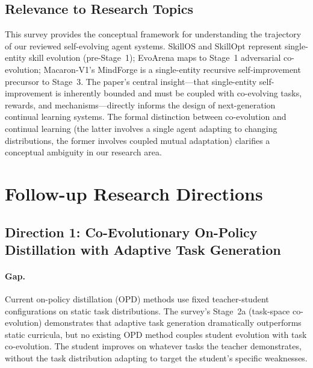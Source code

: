 \documentclass[11pt,a4paper]{article}
\begin{document}
\subsection{Relevance to Research Topics}

This survey provides the conceptual framework for understanding the trajectory of our reviewed self-evolving agent systems. SkillOS and SkillOpt represent single-entity skill evolution (pre-Stage~1); EvoArena maps to Stage~1 adversarial co-evolution; Macaron-V1's MindForge is a single-entity recursive self-improvement precursor to Stage~3. The paper's central insight---that single-entity self-improvement is inherently bounded and must be coupled with co-evolving tasks, rewards, and mechanisms---directly informs the design of next-generation continual learning systems. The formal distinction between co-evolution and continual learning (the latter involves a single agent adapting to changing distributions, the former involves coupled mutual adaptation) clarifies a conceptual ambiguity in our research area.

\section{Follow-up Research Directions}

\subsection{Direction 1: Co-Evolutionary On-Policy Distillation with Adaptive Task Generation}

\paragraph{Gap.} Current on-policy distillation (OPD) methods use fixed teacher-student configurations on static task distributions. The survey's Stage~2a (task-space co-evolution) demonstrates that adaptive task generation dramatically outperforms static curricula, but no existing OPD method couples student evolution with task co-evolution. The student improves on whatever tasks the teacher demonstrates, without the task distribution adapting to target the student's specific weaknesses.
\end{document}
